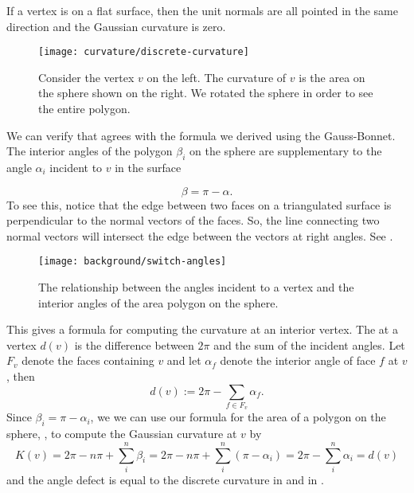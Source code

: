 If a vertex is on a flat surface, then the unit normals are all pointed
in the same direction and the Gaussian curvature is zero.

\begin{figure}[htb]
\centering
\texttt{[image: curvature/discrete-curvature]}
\caption{Consider the vertex $v$ on the left. The curvature of $v$
is the area on the sphere shown on the right. We rotated the sphere
in order to see the entire polygon.}
\label{fig:discrete-curvature}
\end{figure}


We can verify that  agrees with the formula we derived using
the Gauss-Bonnet.
The interior angles of the polygon $\beta_i$ on the sphere are supplementary to
the angle $\alpha_i$ incident to $v$ in the surface

\begin{equation} \label{eqn:switcheroo}
\beta=\pi-\alpha.
\end{equation}
To see this, notice that the edge between two faces
on a triangulated surface
is perpendicular to the normal vectors of the faces.
So, the line connecting two normal vectors will intersect the edge between the vectors 
at right angles. See .


\begin{figure}[htb]
\centering
\texttt{[image: background/switch-angles]}
\caption{The relationship between the angles incident to a vertex and
the interior angles of the area polygon on the sphere.}
\label{fig:switcheroo}
\end{figure}



This gives a  formula for computing the curvature at an interior vertex.
The  at a vertex $d(v)$ is the difference between $2\pi$ and
the sum of the incident angles.  Let $F_v$ denote the faces containing $v$  
and let $\alpha_f$  denote the interior  angle of face $f$ at $v$, then
\begin{equation} \label{eqn:defect}
d(v):=2\pi -\sum_{f\in F_v}\alpha_f.
\end{equation}
Since $\beta_i=\pi-\alpha_i$, we 
we can use our formula for the area of a polygon on the sphere,
, to compute the Gaussian curvature at $v$
by
$$K(v)=2\pi -n\pi+\sum_{i}^n \beta_i=2\pi-n\pi +\sum_{i}^n (\pi-\alpha_i) =2\pi-\sum_i^n\alpha_i=d(v)$$
 and the
 angle defect is equal to the discrete curvature in 
 and in .







